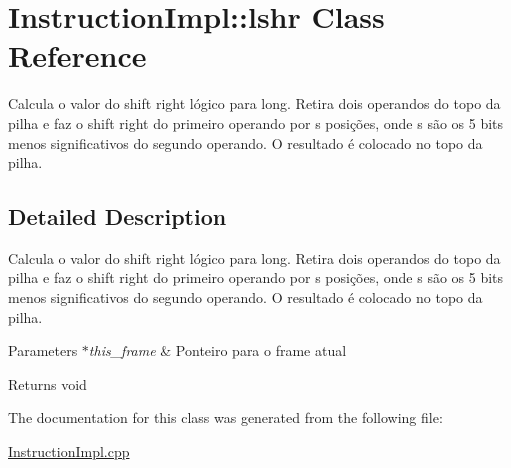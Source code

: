 \hypertarget{class_instruction_impl_1_1lshr}{}\section{Instruction\+Impl\+:\+:lshr Class Reference}
\label{class_instruction_impl_1_1lshr}


Calcula o valor do shift right lógico para long. Retira dois operandos do topo da pilha e faz o shift right do primeiro operando por s posições, onde s são os 5 bits menos significativos do segundo operando. O resultado é colocado no topo da pilha.  




\subsection{Detailed Description}
Calcula o valor do shift right lógico para long. Retira dois operandos do topo da pilha e faz o shift right do primeiro operando por s posições, onde s são os 5 bits menos significativos do segundo operando. O resultado é colocado no topo da pilha. 


\begin{DoxyParams}{Parameters}
{\em $\ast$this\+\_\+frame} & Ponteiro para o frame atual \\
\hline
\end{DoxyParams}
\begin{DoxyReturn}{Returns}
void 
\end{DoxyReturn}


The documentation for this class was generated from the following file\+:\begin{DoxyCompactItemize}
\item 
\hyperlink{_instruction_impl_8cpp}{Instruction\+Impl.\+cpp}\end{DoxyCompactItemize}
